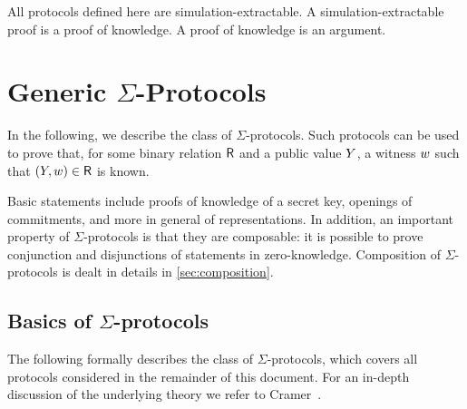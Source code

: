 \documentclass[runningheads,11pt]{article}
\begin{document}
All protocols defined here are simulation-extractable. A simulation-extractable proof is a proof of knowledge. A proof of knowledge is an argument.


\section{Generic $\Sigma$-Protocols}
In the following, we describe the class of $\Sigma$-protocols.
Such protocols can be used to prove that, for some binary relation $\mathsf{R}$ and a public value $Y$, a witness $w$ such that $(Y,w)\in\mathsf{R}$ is known.

\medskip
Basic statements include proofs of knowledge of a secret key, openings of commitments, and more in general of representations.
In addition, an important property of $\Sigma$-protocols is that they are composable: it is possible to prove conjunction and disjunctions of statements in zero-knowledge.
Composition of $\Sigma$-protocols is dealt in details in \cref{sec:composition}.

\subsection{Basics of $\Sigma$-protocols}
The following formally describes the class of $\Sigma$-protocols, which covers all protocols considered in the remainder of this document.
 For an in-depth discussion of the underlying theory we refer to Cramer~\cite{cramer97}.
\end{document}
